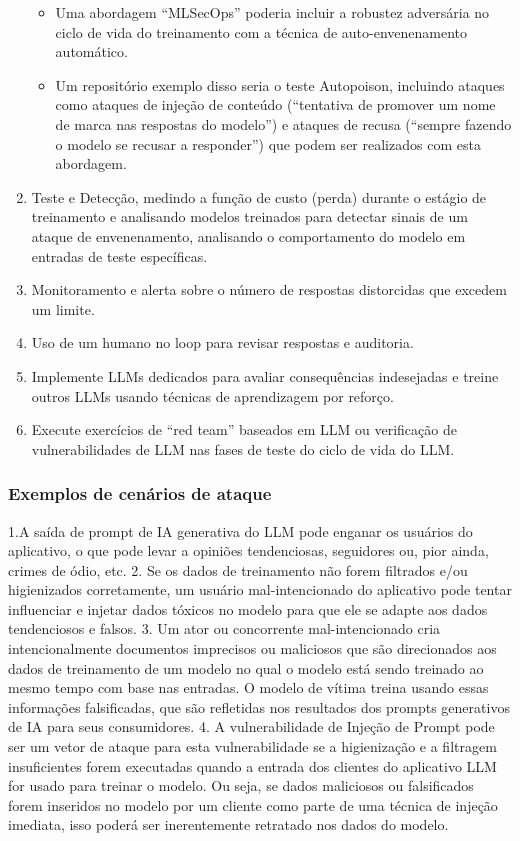 \documentclass[
]{article}
\providecommand{\tightlist}{%
  \setlength{\itemsep}{0pt}\setlength{\parskip}{0pt}}
\begin{document}
\begin{enumerate}
  \begin{itemize}
  \tightlist
  \item
    Uma abordagem ``MLSecOps'' poderia incluir a robustez adversária no
    ciclo de vida do treinamento com a técnica de auto-envenenamento
    automático.
  \item
    Um repositório exemplo disso seria o teste Autopoison, incluindo
    ataques como ataques de injeção de conteúdo (``tentativa de promover
    um nome de marca nas respostas do modelo'') e ataques de recusa
    (``sempre fazendo o modelo se recusar a responder'') que podem ser
    realizados com esta abordagem.
  \end{itemize}
\item
  Teste e Detecção, medindo a função de custo (perda) durante o estágio
  de treinamento e analisando modelos treinados para detectar sinais de
  um ataque de envenenamento, analisando o comportamento do modelo em
  entradas de teste específicas.
\item
  Monitoramento e alerta sobre o número de respostas distorcidas que
  excedem um limite.
\item
  Uso de um humano no loop para revisar respostas e auditoria.
\item
  Implemente LLMs dedicados para avaliar consequências indesejadas e
  treine outros LLMs usando técnicas de aprendizagem por reforço.
\item
  Execute exercícios de ``red team'' baseados em LLM ou verificação de
  vulnerabilidades de LLM nas fases de teste do ciclo de vida do LLM.
\end{enumerate}

\subsubsection{Exemplos de cenários de
ataque}\label{exemplos-de-cenuxe1rios-de-ataque}

1.A saída de prompt de IA generativa do LLM pode enganar os usuários do
aplicativo, o que pode levar a opiniões tendenciosas, seguidores ou,
pior ainda, crimes de ódio, etc. 2. Se os dados de treinamento não forem
filtrados e/ou higienizados corretamente, um usuário mal-intencionado do
aplicativo pode tentar influenciar e injetar dados tóxicos no modelo
para que ele se adapte aos dados tendenciosos e falsos. 3. Um ator ou
concorrente mal-intencionado cria intencionalmente documentos imprecisos
ou maliciosos que são direcionados aos dados de treinamento de um modelo
no qual o modelo está sendo treinado ao mesmo tempo com base nas
entradas. O modelo de vítima treina usando essas informações
falsificadas, que são refletidas nos resultados dos prompts generativos
de IA para seus consumidores. 4. A vulnerabilidade de Injeção de Prompt
pode ser um vetor de ataque para esta vulnerabilidade se a higienização
e a filtragem insuficientes forem executadas quando a entrada dos
clientes do aplicativo LLM for usado para treinar o modelo. Ou seja, se
dados maliciosos ou falsificados forem inseridos no modelo por um
cliente como parte de uma técnica de injeção imediata, isso poderá ser
inerentemente retratado nos dados do modelo.
\end{document}
